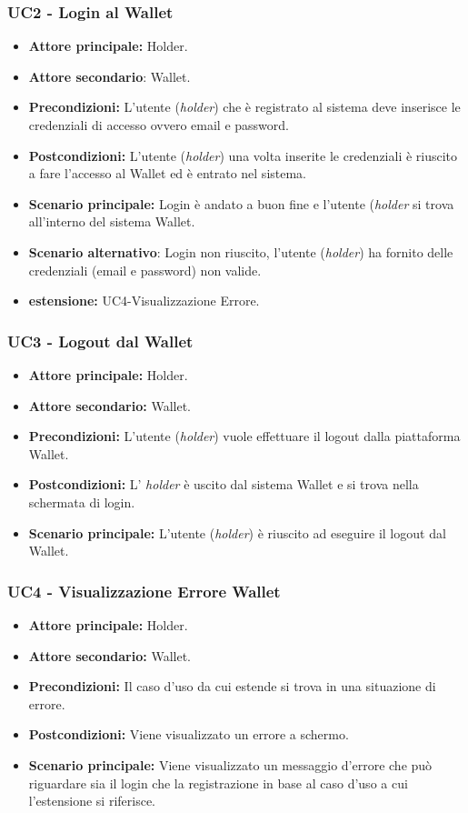 \subsubsection{UC2 - Login al Wallet}
\begin{itemize}
\item \textbf{Attore principale:} Holder.
\item \textbf{Attore secondario}: Wallet. 
\item \textbf{Precondizioni:} L'utente (\textit{holder}) che è registrato al sistema deve inserisce le credenziali di accesso ovvero email e password.
\item \textbf{Postcondizioni:} L'utente (\textit{holder}) una volta inserite le credenziali è riuscito a fare l'accesso al Wallet ed è entrato nel sistema.
\item \textbf{Scenario principale:} Login è andato a buon fine e l'utente  (\textit{holder} si trova all'interno del sistema Wallet.
\item \textbf{Scenario alternativo}: Login non riuscito, l'utente (\textit{holder}) ha fornito delle credenziali (email e password) non valide.
\item \textbf{estensione:} UC4-Visualizzazione Errore.
\end{itemize}

\subsubsection{UC3 - Logout dal Wallet}
\begin{itemize}
\item \textbf{Attore principale:} Holder.
\item \textbf{Attore secondario:} Wallet.
\item \textbf{Precondizioni:} L'utente (\textit{holder}) vuole effettuare il logout dalla piattaforma Wallet.
\item \textbf{Postcondizioni:} L' \textit{holder} è uscito dal sistema Wallet e si trova nella schermata di login.
\item \textbf{Scenario principale:} L'utente (\textit{holder}) è riuscito ad eseguire il logout dal Wallet. 
\end{itemize}

\subsubsection{UC4 - Visualizzazione Errore Wallet}
\begin{itemize}
\item \textbf{Attore principale:} Holder.
\item \textbf{Attore secondario:} Wallet.
\item \textbf{Precondizioni:} Il caso d'uso da cui estende si trova in una situazione di errore.
\item \textbf{Postcondizioni:} Viene visualizzato un errore a schermo. 
\item \textbf{Scenario principale:} Viene visualizzato un messaggio d’errore che può riguardare sia il login che la registrazione in base al caso d’uso a cui l’estensione si riferisce.
\end{itemize}

